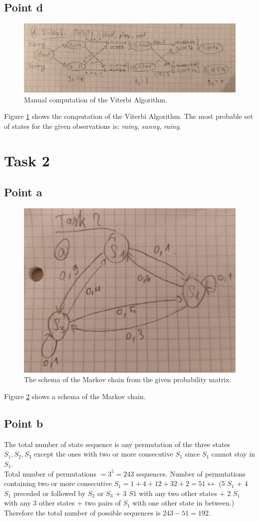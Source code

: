 \documentclass[11pt]{article}
\begin{document}
\subsection{Point d}
\begin{figure}[!ht]
\center
\includegraphics[width=.9\columnwidth]{viterbi}
\caption{Manual computation of the Viterbi Algorithm.}
\label{fig:viterbi-task1}
\end{figure}

Figure \ref{fig:viterbi-task1} shows the computation of the Viterbi Algorithm. The most probable set of states for the given observations is: \textit{rainy}, \textit{sunny}, \textit{rainy}.

\section{Task 2}
\subsection{Point a}
\begin{figure}[!ht]
\center
\includegraphics[width=.5\columnwidth]{chain_task2}
\caption{The schema of the Markov chain from the given probability matrix.}
\label{fig:chain-task2}
\end{figure}

Figure \ref{fig:chain-task2} shows a schema of the Markov chain.

\subsection{Point b}
The total number of state sequence is any permutation of the three states $S_1,S_2,S_3$ except the ones with two or more consecutive $S_1$ since $S_1$ cannot stay in $S_1$. \\
Total number of permutations $= 3^5 = 243$ sequences.
Number of permutations containing two or more consecutive $S_1 = 1 + 4 + 12 + 32 + 2 = 51 \leftrightarrow$ (5 $S_1$ + 4 $S_1$ preceded or followed by $S_2$ or $S_3$ + 3 $S1$ with any two other states + 2 $S_1$ with any 3 other states + two pairs of $S_1$ with one other state in between.) \\
Therefore the total number of possible sequences is $243 - 51 = 192$.
\end{document}
